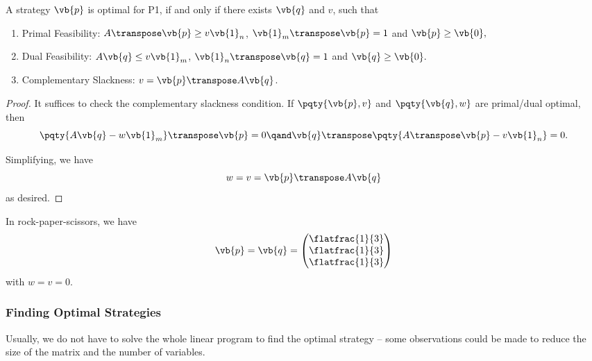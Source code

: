 \begin{theorem}
    A strategy \(\vb{p}\) is optimal for P1, if and only if there exists \(\vb{q}\) and \(v\), such that
    \begin{enumerate}
        \item Primal Feasibility: \(A\transpose \vb{p} \geq v \vb{1}_n\), \(\vb{1}_m\transpose \vb{p} = 1\) and \(\vb{p} \geq \vb{0},\)
        \item Dual Feasibility: \(A \vb{q} \leq v \vb{1}_m\), \(\vb{1}_n\transpose \vb{q} = 1\) and \(\vb{q} \geq \vb{0}.\)
        \item Complementary Slackness: \(v = \vb{p}\transpose A\vb{q}\).
    \end{enumerate}
\end{theorem}

\begin{proof}
    It suffices to check the complementary slackness condition. If \(\pqty{\vb{p}, v}\) and \(\pqty{\vb{q}, w}\) are primal/dual optimal, then
    \[
        \pqty{A\vb{q} - w \vb{1}_m}\transpose \vb{p} = 0 \qand \vb{q}\transpose \pqty{A\transpose \vb{p} - v \vb{1}_n} = 0.
    \]

    Simplifying, we have
    \[
        w = v = \vb{p}\transpose A \vb{q}
    \]
    as desired.
\end{proof}

\begin{example}
    In rock-paper-scissors, we have
    \[
        \vb{p} = \vb{q} = \begin{pmatrix}
            \flatfrac{1}{3} \\ \flatfrac{1}{3} \\ \flatfrac{1}{3}
        \end{pmatrix}
    \]
    with \(w = v = 0\).
\end{example}

\subsubsection{Finding Optimal Strategies}

Usually, we do not have to solve the whole linear program to find the optimal strategy -- some observations could be made to reduce the size of the matrix and the number of variables.

